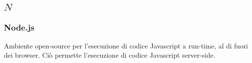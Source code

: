 \subsection*{\quad$N\quad$}
\subsubsection*{Node.js}
Ambiente open-source per l'esecuzione di codice Javascript a run-time, al di fuori dei browser. Ciò permette l'esecuzione di codice Javascript server-side.

